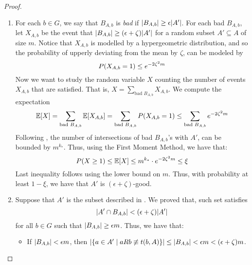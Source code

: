 \begin{lemma}[Claim 5.13]
\begin{proof}
\begin{enumerate}[label=(\alph*), ref=\alph*]
            \item For each $b \in G$, we say that $B_{A,b}$ is \emph{bad} if $| B_{A,b} | \geq \epsilon | A' |$.
                For each bad $B_{A,b}$, let $X_{A,b}$ be the event that
                $| B_{A,b} | \geq ( \epsilon + \zeta ) | A' |$ for a random subset
                $A' \subseteq A$ of size $m$.
                Notice that $X_{A,b}$ is modelled by a hypergeometric distribution, and so the probability of
                upperly deviating from the mean by $\zeta$, can be modeled by
                \[
                    P( X_{A,b} = 1 ) \leq e^{-2\zeta^2 m}
                \]
                Now we want to study the random variable $X$ counting the number of events $X_{A,b}$ that are satisfied.
                That is, $X = \sum_{\text{bad } B_{A,b}} X_{A,b}$.
                We compute the expectation
                \[
                    \mathbb{E}[X] = \sum_{\text{bad } B_{A,b}} \mathbb{E}[X_{A,b}]
                        = \sum_{\text{bad } B_{A,b}} P( X_{A,b} = 1 )
                        \leq \sum_{\text{bad } B_{A,b}} e^{-2\zeta^2 m}
                \]
                Following , the number of intersections of bad $B_{A,b}$'s with $A'$, can be bounded
                by $m^{k_*}$.
                Thus, using the First Moment Method, we have that:
                \[
                    P( X \geq 1 ) \leq \mathbb{E}[X] \leq m^{k_*} \cdot e^{-2\zeta^2 m} \leq \xi
                \]
                Last inequality follows  using the lower bound on $m$.
                Thus, with probability at least $1 - \xi$, we have that $A'$ is $(\epsilon + \zeta)$-good.
            \item Suppose that $A'$ is the subset described in .
                We proved that, such set satisfies
                \[
                    | A' \cap B_{A,b} | < ( \epsilon + \zeta ) | A' |
                \]
                for all $b \in G$ such that $| B_{A,b} | \geq \epsilon m$.
                Thus, we have that:
                \begin{itemize}
                    \item If $| B_{A,b} | < \epsilon m$, then
                        $| \{ a \in A' \mid a R b \not \equiv t(b,A) \} | \leq | B_{A,b} |
                        < \epsilon m < ( \epsilon + \zeta ) m$.

\end{itemize}
\end{enumerate}
\end{proof}
\end{lemma}
